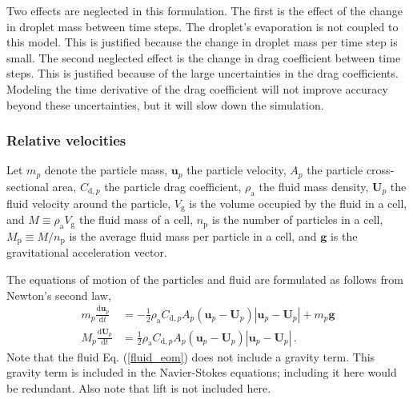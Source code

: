 Two effects are neglected in this formulation. The first is the effect of the change in droplet mass between  time steps. The droplet's evaporation is not coupled to this model. This is justified because the change in droplet mass per time step is small. The second neglected effect is the change in drag coefficient between time steps. This is justified because of the large uncertainties in the drag coefficients. Modeling the time derivative of the drag coefficient will not improve accuracy beyond these uncertainties, but it will slow down the simulation.

\subsubsection{Relative velocities}
Let $m_p$ denote the particle mass, $\mathbf{u}_p$ the particle velocity, $A_p$ the particle cross-sectional area, $C_{\text{d},p}$ the particle drag coefficient, $\rho_\text{a}$ the fluid mass density, $\mathbf{U}_p$ the fluid velocity around the particle, $V_\text{g}$ is the volume occupied by the fluid in a cell, and $M \equiv \rho_\text{a} V_\text{g}$ the fluid mass of a cell, $n_\text{p}$ is the number of particles in a cell, $M_\text{p} \equiv M/n_\text{p}$ is the average fluid mass per particle in a cell, and $\mathbf{g}$ is the gravitational acceleration vector.

The equations of motion of the particles and fluid are formulated as follows from Newton's second law,
\begin{align}
    \label{particle_eom}
    m_p \frac{\text{d} \mathbf{u}_p}{\text{d} t} &= - \frac{1}{2} \rho_\text{a} C_{\text{d},p} A_p (\mathbf{u}_p - \mathbf{U}_p) |\mathbf{u}_p - \mathbf{U}_p| + m_p \mathbf{g} \\
    \label{fluid_eom}
    M_p \frac{\text{d} \mathbf{U}_p}{\text{d} t} &= \frac{1}{2} \rho_\text{a} C_{\text{d},p} A_p (\mathbf{u}_p - \mathbf{U}_p) |\mathbf{u}_p - \mathbf{U}_p| \,.
\end{align}
Note that the fluid Eq. (\ref{fluid_eom}) does not include a gravity term. This gravity term is included in the Navier-Stokes equations; including it here would be redundant. Also note that lift is not included here.

